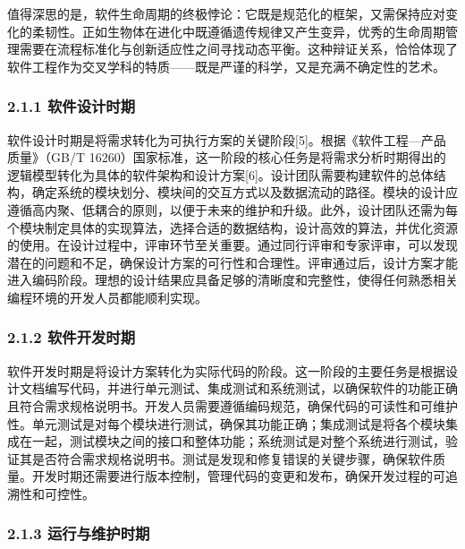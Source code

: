 值得深思的是，软件生命周期的终极悖论：它既是规范化的框架，又需保持应对变化的柔韧性。正如生物体在进化中既遵循遗传规律又产生变异，优秀的生命周期管理需要在流程标准化与创新适应性之间寻找动态平衡。这种辩证关系，恰恰体现了软件工程作为交叉学科的特质------既是严谨的科学，又是充满不确定性的艺术。

\hypertarget{ux8f6fux4ef6ux8bbeux8ba1ux65f6ux671f}{%
\subsubsection{2.1.1 软件设计时期}\label{ux8f6fux4ef6ux8bbeux8ba1ux65f6ux671f}}

软件设计时期是将需求转化为可执行方案的关键阶段{[}5{]}。根据《软件工程---产品质量》（GB/T 16260）国家标准，这一阶段的核心任务是将需求分析时期得出的逻辑模型转化为具体的软件架构和设计方案{[}6{]}。设计团队需要构建软件的总体结构，确定系统的模块划分、模块间的交互方式以及数据流动的路径。模块的设计应遵循高内聚、低耦合的原则，以便于未来的维护和升级。此外，设计团队还需为每个模块制定具体的实现算法，选择合适的数据结构，设计高效的算法，并优化资源的使用。在设计过程中，评审环节至关重要。通过同行评审和专家评审，可以发现潜在的问题和不足，确保设计方案的可行性和合理性。评审通过后，设计方案才能进入编码阶段。理想的设计结果应具备足够的清晰度和完整性，使得任何熟悉相关编程环境的开发人员都能顺利实现。

\hypertarget{ux8f6fux4ef6ux5f00ux53d1ux65f6ux671f}{%
\subsubsection{2.1.2 软件开发时期}\label{ux8f6fux4ef6ux5f00ux53d1ux65f6ux671f}}

软件开发时期是将设计方案转化为实际代码的阶段。这一阶段的主要任务是根据设计文档编写代码，并进行单元测试、集成测试和系统测试，以确保软件的功能正确且符合需求规格说明书。开发人员需要遵循编码规范，确保代码的可读性和可维护性。单元测试是对每个模块进行测试，确保其功能正确；集成测试是将各个模块集成在一起，测试模块之间的接口和整体功能；系统测试是对整个系统进行测试，验证其是否符合需求规格说明书。测试是发现和修复错误的关键步骤，确保软件质量。开发时期还需要进行版本控制，管理代码的变更和发布，确保开发过程的可追溯性和可控性。

\hypertarget{ux8fd0ux884cux4e0eux7ef4ux62a4ux65f6ux671f}{%
\subsubsection{2.1.3 运行与维护时期}\label{ux8fd0ux884cux4e0eux7ef4ux62a4ux65f6ux671f}}

